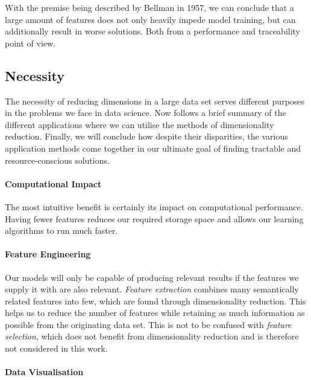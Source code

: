 With the premise being described by Bellman in 1957, we can conclude that a large amount of features does not only heavily impede model training, but can additionally result in worse solutions. \cite{HandsOnMLCh8}
Both from a performance and traceability point of view.

\vfill

\clearpage


\subsection{Necessity}

The necessity of reducing dimensions in a large data set serves different purposes in the problems we face in data science. 
Now follows a brief summary of the different applications where we can utilise the methods of dimensionality reduction. 
Finally, we will conclude how despite their disparities, the various application methods come together in our ultimate goal of finding tractable and resource-conscious solutions.

\paragraph{Computational Impact}

The most intuitive benefit is certainly its impact on computational performance.
Having fewer features reduces our required storage space and allows our learning algorithms to run much faster. \cite{PythonMachineLearningCh1}

\paragraph{Feature Engineering}

Our models will only be capable of producing relevant results if the features we supply it with are also relevant. \cite{HandsOnMLCh1}
\emph{Feature extraction} combines many semantically related features into few, which are found through dimensionality reduction. 
This helps us to reduce the number of features while retaining as much information as possible from the originating data set.
This is not to be confused with \emph{feature selection}, which does not benefit from dimensionality reduction and is therefore not considered in this work.

\paragraph{Data Visualisation}

